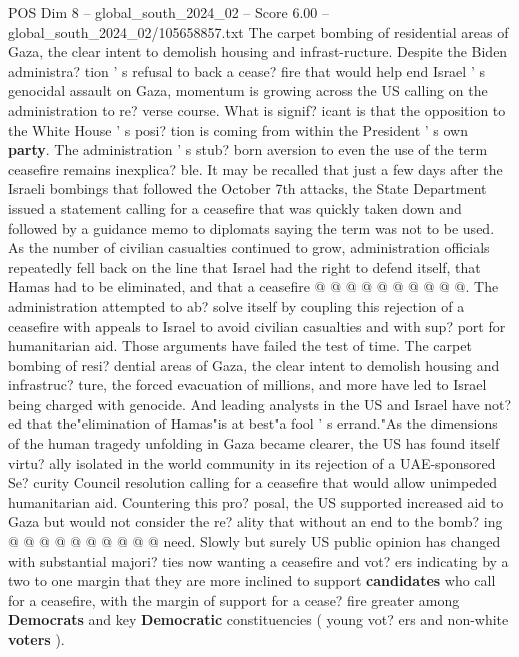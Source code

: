 \begin{textsample}{POS Dim 8 – global\_south\_2024\_02 – Score 6.00 – global\_south\_2024\_02/105658857.txt}  \label{ex:f8_pos_202}
The carpet bombing of residential areas of Gaza, the clear intent to demolish housing and infrast-ructure.
Despite the Biden administra? tion ' s refusal to back a cease? fire that would help end Israel ' s genocidal assault on Gaza, momentum is growing across the US calling on the administration to re? verse course.
What is signif? icant is that the opposition to the White House ' s posi? tion is coming from within the President ' s own \textbf{party}.
The administration ' s stub? born aversion to even the use of the term ceasefire remains inexplica? ble.
It may be recalled that just a few days after the Israeli bombings that followed the October 7th attacks, the State Department issued a statement calling for a ceasefire that was quickly taken down and followed by a guidance memo to diplomats saying the term was not to be used.
As the number of civilian casualties continued to grow, administration officials repeatedly fell back on the line that Israel had the right to defend itself, that Hamas had to be eliminated, and that a ceasefire @ @ @ @ @ @ @ @ @ @.
The administration attempted to ab? solve itself by coupling this rejection of a ceasefire with appeals to Israel to avoid civilian casualties and with sup? port for humanitarian aid.
Those arguments have failed the test of time.
The carpet bombing of resi? dential areas of Gaza, the clear intent to demolish housing and infrastruc? ture, the forced evacuation of millions, and more have led to Israel being charged with genocide.
And leading analysts in the US and Israel have not? ed that the"elimination of Hamas"is at best"a fool ' s errand."As the dimensions of the human tragedy unfolding in Gaza became clearer, the US has found itself virtu? ally isolated in the world community in its rejection of a UAE-sponsored Se? curity Council resolution calling for a ceasefire that would allow unimpeded humanitarian aid.
Countering this pro? posal, the US supported increased aid to Gaza but would not consider the re? ality that without an end to the bomb? ing @ @ @ @ @ @ @ @ @ @ need.
Slowly but surely US public opinion has changed with substantial majori? ties now wanting a ceasefire and vot? ers indicating by a two to one margin that they are more inclined to support \textbf{candidates} who call for a ceasefire, with the margin of support for a cease? fire greater among \textbf{Democrats} and key \textbf{Democratic} constituencies ( young vot? ers and non-white \textbf{voters} ).

\end{textsample}
